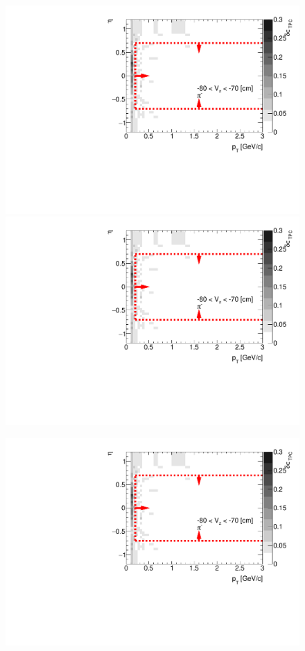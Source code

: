 \begin{figure}[H]
{		\includegraphics[width=\linewidth,page=11]{graphics/systematicsEfficiency/deadMaterial/secondaries_Unbinned_SD_.pdf}
		\includegraphics[width=\linewidth,page=14]{graphics/systematicsEfficiency/deadMaterial/secondaries_Unbinned_SD_.pdf}\\
	}%
	\parbox{0.325\textwidth}{
		\includegraphics[width=\linewidth,page=3]{graphics/systematicsEfficiency/deadMaterial/secondaries_Unbinned_SD_.pdf}\\
}
\end{figure}
